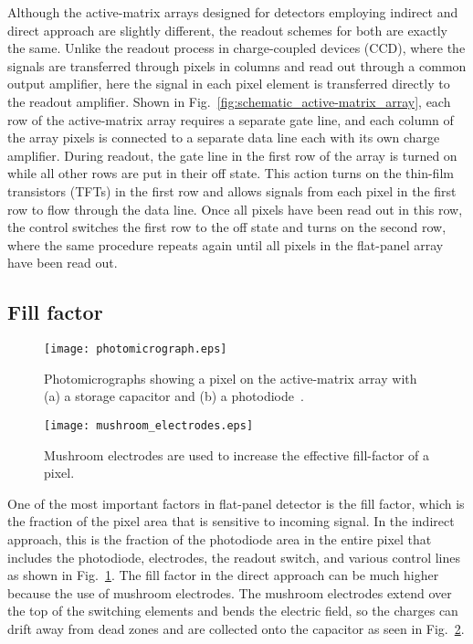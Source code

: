 Although the active-matrix arrays designed for detectors employing indirect and direct approach are slightly different, the readout schemes for both are exactly the same.  Unlike the readout process in charge-coupled devices (CCD), where the signals are transferred through pixels in columns and read out through a common output amplifier, here the signal in each pixel element is transferred directly to the readout amplifier.  Shown in Fig.~\ref{fig:schematic_active-matrix_array}, each row of the active-matrix array requires a separate gate line, and each column of the array pixels is connected to a separate data line each with its own charge amplifier.  During readout, the gate line in the first row of the array is turned on while all other rows are put in their off state.  This action turns on the thin-film transistors (TFTs) in the first row and allows signals from each pixel in the first row to flow through the data line.  Once all pixels have been read out in this row, the control switches the first row to the off state and turns on the second row, where the same procedure repeats again until all pixels in the flat-panel array have been read out.  

\subsection{Fill factor}
%
\begin{figure}[ht]
\texttt{[image: photomicrograph.eps]}
\caption[]{Photomicrographs showing a pixel on the active-matrix array with (a) a storage capacitor and (b) a photodiode\footnotemark~\citep{Rowlands2000}.}
\label{fig:pixel_fill_factor}
\end{figure}
%
\begin{figure}[ht]
\texttt{[image: mushroom\_electrodes.eps]}
\caption{Mushroom electrodes are used to increase the effective fill-factor of a pixel.}
\label{fig:mushroom_electrodes}
\end{figure}

One of the most important factors in flat-panel detector is the fill factor, which is the fraction of the pixel area that is sensitive to incoming signal.  In the indirect approach, this is the fraction of the photodiode area in the entire pixel that includes the photodiode, electrodes, the readout switch, and various control lines as shown in Fig.~\ref{fig:pixel_fill_factor}.  The fill factor in the direct approach can be much higher because the use of mushroom electrodes.  The mushroom electrodes extend over the top of the switching elements and bends the electric field, so the charges can drift away from dead zones and are collected onto the capacitor as seen in Fig.~\ref{fig:mushroom_electrodes}.

